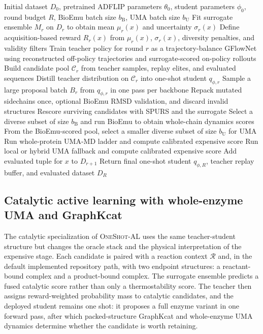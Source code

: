 \documentclass[11pt]{article}
\newcommand{\methodIII}{\textsc{OneShot-AL}}
\begin{document}
	\begin{algorithm}[H]
		\caption{\methodIII{}: active-learning teacher policy with one-shot ADFLIP student}
		\label{alg:method3}
		\begin{algorithmic}[1]
			\Require Initial dataset $D_0$, pretrained ADFLIP parameters $\theta_0$, student parameters $\phi_0$, round budget $R$, BioEmu batch size $b_{\mathrm B}$, UMA batch size $b_{\mathrm U}$
			\State Fit surrogate ensemble $M_r$ on $D_r$ to obtain mean $\mu_r(x)$ and uncertainty $\sigma_r(x)$
			\State Define acquisition-based reward $R_r(x)$ from $\mu_r(x)$, $\sigma_r(x)$, diversity penalties, and validity filters
			\State Train teacher policy for round $r$ as a trajectory-balance GFlowNet using reconstructed off-policy trajectories and surrogate-scored on-policy rollouts
			\State Build candidate pool $\mathcal{C}_r$ from teacher samples, replay elites, and evaluated sequences
			\State Distill teacher distribution on $\mathcal{C}_r$ into one-shot student $q_{\phi,r}$
			\State Sample a large proposal batch $B_r$ from $q_{\phi,r}$ in one pass per backbone
			\State Repack mutated sidechains once, optional BioEmu RMSD validation, and discard invalid structures
			\State Rescore surviving candidates with SPURS and the surrogate
			\State Select a diverse subset of size $b_{\mathrm B}$ and run BioEmu to obtain whole-chain dynamics scores
			\State From the BioEmu-scored pool, select a smaller diverse subset of size $b_{\mathrm U}$ for UMA
			\State Run whole-protein UMA-MD ladder and compute calibrated expensive score
			\Else
			\State Run local or hybrid UMA fallback and compute calibrated expensive score
			\EndIf
			\State Add evaluated tuple for $x$ to $D_{r+1}$
			\EndFor
			\EndFor
			\State Return final one-shot student $q_{\phi,R}$, teacher replay buffer, and evaluated dataset $D_R$
		\end{algorithmic}
	\end{algorithm}
	
	\subsection{Catalytic active learning with whole-enzyme UMA and GraphKcat}
	
	The catalytic specialization of \methodIII{} uses the same teacher-student structure but changes the oracle stack and the physical interpretation of the expensive stage. Each candidate is paired with a reaction context $\mathcal{R}$ and, in the default implemented repository path, with two endpoint structures: a reactant-bound complex and a product-bound complex. The surrogate ensemble predicts a fused catalytic score rather than only a thermostability score. The teacher then assigns reward-weighted probability mass to catalytic candidates, and the deployed student remains one shot: it proposes a full enzyme variant in one forward pass, after which packed-structure GraphKcat and whole-enzyme UMA dynamics determine whether the candidate is worth retaining.
	
\end{document}
